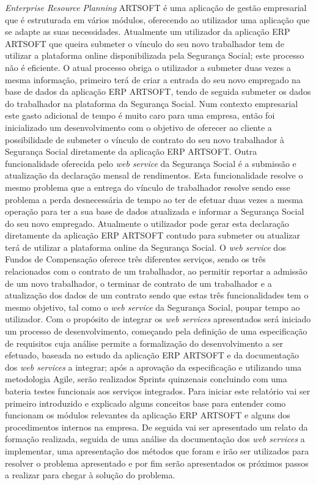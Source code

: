\documentclass[sigplan]{acmart}
\begin{document}
\textit{Enterprise Resource Planning} ARTSOFT é uma aplicação de gestão empresarial que é estruturada em vários módulos, oferecendo ao utilizador uma aplicação que se adapte as suas necessidades. Atualmente um utilizador da aplicação ERP ARTSOFT que queira submeter o vínculo do seu novo trabalhador tem de utilizar a plataforma online disponibilizada pela Segurança Social; este processo não é eficiente. O atual processo obriga o utilizador a submeter duas vezes a mesma informação, primeiro terá de criar a entrada do seu novo empregado na base de dados da aplicação ERP ARTSOFT, tendo de seguida submeter os dados do trabalhador na plataforma da Segurança Social. Num contexto empresarial este gasto adicional de tempo é muito caro para uma empresa, então foi inicializado um desenvolvimento com o objetivo de oferecer ao cliente a possibilidade de submeter o vínculo de contrato do seu novo trabalhador à Segurança Social diretamente da aplicação ERP ARTSOFT. Outra funcionalidade oferecida pelo \textit{web service} da Segurança Social é a submissão e atualização da declaração mensal de rendimentos. Esta funcionalidade resolve o mesmo problema que a entrega do vínculo de trabalhador resolve sendo esse problema a perda desnecessária de tempo ao ter de efetuar duas vezes a mesma operação para ter a sua base de dados atualizada e informar a Segurança Social do seu novo empregado. Atualmente o utilizador pode gerar esta declaração diretamente da aplicação ERP ARTSOFT contudo para submeter ou atualizar terá de utilizar a plataforma online da Segurança Social. O \textit{web service} dos Fundos de Compensação oferece três diferentes serviços, sendo os três relacionados com o contrato de um trabalhador, ao permitir reportar a admissão de um novo trabalhador, o terminar de contrato de um trabalhador e a atualização dos dados de um contrato sendo que estas três funcionalidades tem o mesmo objetivo, tal como o \textit{web service} da Segurança Social, poupar tempo ao utilizador. Com o propósito de integrar os \textit{web services} apresentados será iniciado um processo de desenvolvimento, começando pela definição de uma especificação de requisitos cuja análise permite a formalização do desenvolvimento a ser efetuado, baseada no estudo da aplicação ERP ARTSOFT e da documentação dos \textit{web services} a integrar; após a aprovação da especificação e utilizando uma metodologia Agile, serão realizados Sprints quinzenais concluindo com uma bateria testes funcionais aos serviços integrados. Para iniciar este relatório vai ser primeiro introduzido e explicado alguns conceitos base para entender como funcionam os módulos relevantes da aplicação ERP ARTSOFT e alguns dos procedimentos internos na empresa. De seguida vai ser apresentado um relato da formação realizada, seguida de uma análise da documentação dos \textit{web services} a implementar, uma apresentação dos métodos que foram e irão ser utilizados para resolver o problema apresentado e por fim serão apresentados os próximos passos a realizar para chegar à solução do problema.
\end{document}
